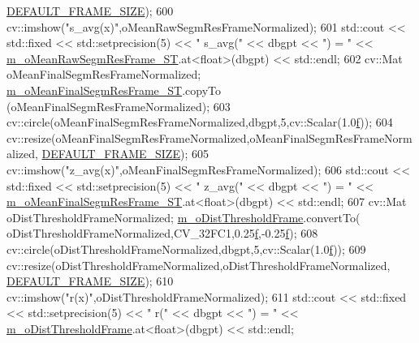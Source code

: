 \begin{DoxyCode}
      \mbox{\hyperlink{_background_subtractor_su_b_s_e_n_s_e_8cpp_aee6405a4f74939fffcc9b3055af94b3a}{DEFAULT\_FRAME\_SIZE}});
600     cv::imshow(\textcolor{stringliteral}{"s\_avg(x)"},oMeanRawSegmResFrameNormalized);
601     std::cout << std::fixed << std::setprecision(5) << \textcolor{stringliteral}{"  s\_avg("} << dbgpt << \textcolor{stringliteral}{") = "} << 
      \mbox{\hyperlink{class_background_subtractor_su_b_s_e_n_s_e_a3c9fd9cf995eb9a7b4006467ab874958}{m\_oMeanRawSegmResFrame\_ST}}.at<\textcolor{keywordtype}{float}>(dbgpt) << std::endl;
602     cv::Mat oMeanFinalSegmResFrameNormalized; \mbox{\hyperlink{class_background_subtractor_su_b_s_e_n_s_e_a0dcd4f5df8adb9b4fa630a9a6f6b5e30}{m\_oMeanFinalSegmResFrame\_ST}}.copyTo
      (oMeanFinalSegmResFrameNormalized);
603     cv::circle(oMeanFinalSegmResFrameNormalized,dbgpt,5,cv::Scalar(1.0\mbox{\hyperlink{rings_8cpp_a77369fc4d5326a16d2c603e032023528}{f}}));
604     cv::resize(oMeanFinalSegmResFrameNormalized,oMeanFinalSegmResFrameNormalized,
      \mbox{\hyperlink{_background_subtractor_su_b_s_e_n_s_e_8cpp_aee6405a4f74939fffcc9b3055af94b3a}{DEFAULT\_FRAME\_SIZE}});
605     cv::imshow(\textcolor{stringliteral}{"z\_avg(x)"},oMeanFinalSegmResFrameNormalized);
606     std::cout << std::fixed << std::setprecision(5) << \textcolor{stringliteral}{"  z\_avg("} << dbgpt << \textcolor{stringliteral}{") = "} << 
      \mbox{\hyperlink{class_background_subtractor_su_b_s_e_n_s_e_a0dcd4f5df8adb9b4fa630a9a6f6b5e30}{m\_oMeanFinalSegmResFrame\_ST}}.at<\textcolor{keywordtype}{float}>(dbgpt) << std::endl;
607     cv::Mat oDistThresholdFrameNormalized; \mbox{\hyperlink{class_background_subtractor_su_b_s_e_n_s_e_a491a1e2b81dee87a721a421719bf2836}{m\_oDistThresholdFrame}}.convertTo(
      oDistThresholdFrameNormalized,CV\_32FC1,0.25\mbox{\hyperlink{rings_8cpp_a77369fc4d5326a16d2c603e032023528}{f}},-0.25\mbox{\hyperlink{rings_8cpp_a77369fc4d5326a16d2c603e032023528}{f}});
608     cv::circle(oDistThresholdFrameNormalized,dbgpt,5,cv::Scalar(1.0\mbox{\hyperlink{rings_8cpp_a77369fc4d5326a16d2c603e032023528}{f}}));
609     cv::resize(oDistThresholdFrameNormalized,oDistThresholdFrameNormalized,
      \mbox{\hyperlink{_background_subtractor_su_b_s_e_n_s_e_8cpp_aee6405a4f74939fffcc9b3055af94b3a}{DEFAULT\_FRAME\_SIZE}});
610     cv::imshow(\textcolor{stringliteral}{"r(x)"},oDistThresholdFrameNormalized);
611     std::cout << std::fixed << std::setprecision(5) << \textcolor{stringliteral}{"      r("} << dbgpt << \textcolor{stringliteral}{") = "} << 
      \mbox{\hyperlink{class_background_subtractor_su_b_s_e_n_s_e_a491a1e2b81dee87a721a421719bf2836}{m\_oDistThresholdFrame}}.at<\textcolor{keywordtype}{float}>(dbgpt) << std::endl;

\end{DoxyCode}
